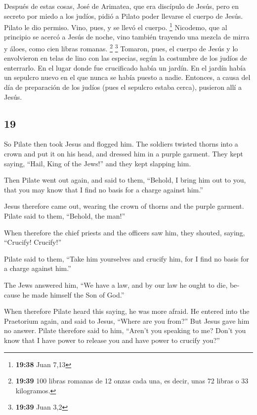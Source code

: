 \begin{paracol}{2}
 Después de estas cosas, José de Arimatea, que era
discípulo de Jesús, pero en secreto por miedo a los judíos, pidió a
Pilato poder llevarse el cuerpo de Jesús. Pilato le dio permiso. Vino,
pues, y se llevó el cuerpo. \footnote{\textbf{19:38} Juan 7,13}
 Nicodemo, que al principio se acercó a Jesús de noche,
vino también trayendo una mezcla de mirra y áloes, como cien libras
romanas. \footnote{\textbf{19:39} 100 libras romanas de 12 onzas cada
  una, es decir, unas 72 libras o 33 kilogramos.} \footnote{\textbf{19:39}
  Juan 3,2}  Tomaron, pues, el cuerpo de Jesús y lo
envolvieron en telas de lino con las especias, según la costumbre de los
judíos de enterrarlo.  En el lugar donde fue crucificado
había un jardín. En el jardín había un sepulcro nuevo en el que nunca se
había puesto a nadie.  Entonces, a causa del día de
preparación de los judíos (pues el sepulcro estaba cerca), pusieron allí
a Jesús.

\switchcolumn
\begin{otherlanguage}{english}

\hypertarget{section-37}{%
\section{19}\label{section-37}}

 So Pilate then took Jesus and flogged him. 
The soldiers twisted thorns into a crown and put it on his head, and
dressed him in a purple garment.  They kept saying,
``Hail, King of the Jews!'' and they kept slapping him.

 Then Pilate went out again, and said to them, ``Behold, I
bring him out to you, that you may know that I find no basis for a
charge against him.''

 Jesus therefore came out, wearing the crown of thorns and
the purple garment. Pilate said to them, ``Behold, the man!''

 When therefore the chief priests and the officers saw
him, they shouted, saying, ``Crucify! Crucify!''

Pilate said to them, ``Take him yourselves and crucify him, for I find
no basis for a charge against him.''

 The Jews answered him, ``We have a law, and by our law he
ought to die, because he made himself the Son of God.''

 When therefore Pilate heard this saying, he was more
afraid.  He entered into the Praetorium again, and said to
Jesus, ``Where are you from?'' But Jesus gave him no answer.
 Pilate therefore said to him, ``Aren't you speaking to
me? Don't you know that I have power to release you and have power to
crucify you?''


\end{otherlanguage}
\end{paracol}
